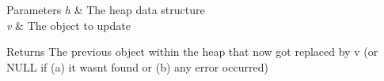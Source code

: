 \begin{DoxyParams}{Parameters}
{\em h} & The heap data structure \\
\hline
{\em v} & The object to update \\
\hline
\end{DoxyParams}
\begin{DoxyReturn}{Returns}
The \textquotesingle{}previous\textquotesingle{} object within the heap that now got replaced by {\ttfamily v} (or N\+U\+LL if (a) it wasn\textquotesingle{}t found or (b) any error occurred) 
\end{DoxyReturn}
